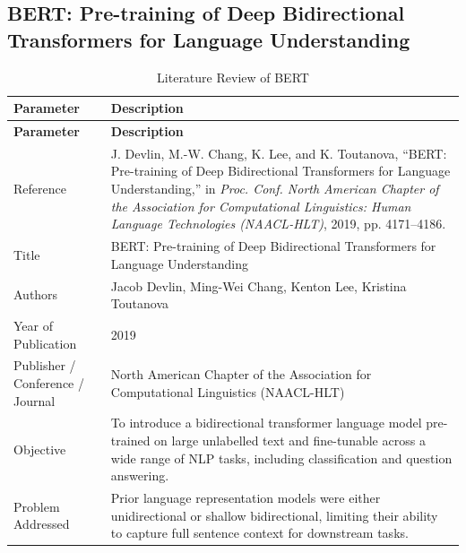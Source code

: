 \subsection{BERT: Pre-training of Deep Bidirectional Transformers for Language Understanding}

\def\PaperTitle{BERT}
\def\PaperLabel{tab:paper6}

\renewcommand{\arraystretch}{1.4}

\begin{longtable}{|p{5cm}|p{10cm}|}
\caption{Literature Review of BERT}
\label{tab:paper6}\\

\hline
\textbf{Parameter} & \textbf{Description} \\
\hline
\endfirsthead

\hline
\textbf{Parameter} & \textbf{Description} \\
\hline
\endhead

Reference &
J. Devlin, M.-W. Chang, K. Lee, and K. Toutanova, ``BERT: Pre-training of Deep Bidirectional Transformers for Language Understanding,'' in \textit{Proc. Conf. North American Chapter of the Association for Computational Linguistics: Human Language Technologies (NAACL-HLT)}, 2019, pp. 4171--4186.
\\ \hline

Title &
BERT: Pre-training of Deep Bidirectional Transformers for Language Understanding
\\ \hline

Authors &
Jacob Devlin, Ming-Wei Chang, Kenton Lee, Kristina Toutanova
\\ \hline

Year of Publication &
2019
\\ \hline

Publisher / Conference / Journal &
North American Chapter of the Association for Computational Linguistics (NAACL-HLT)
\\ \hline

Objective &
To introduce a bidirectional transformer language model pre-trained on large unlabelled text and fine-tunable across a wide range of NLP tasks, including classification and question answering.
\\ \hline

Problem Addressed &
Prior language representation models were either unidirectional or shallow bidirectional, limiting their ability to capture full sentence context for downstream tasks.
\\ \hline


\end{longtable}

